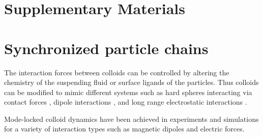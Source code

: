 \documentclass[twocolumn,preprintnumbers,amsmath,amssymb,aps,prx]{revtex4}
\begin{document}
%
%


\section{Supplementary Materials}


\section{Synchronized particle chains}
\label{sec:sync}
The interaction forces between colloids can be controlled 
by altering the chemistry of the suspending fluid
or surface ligands of the particles.
Thus colloids can 
be modified to mimic different
systems such as hard spheres interacting via contact forces \cite{},
dipole interactions \cite{},
and long range electrostatic interactions \cite{}.

Mode-locked 
colloid dynamics have been achieved in 
experiments \cite{Juniper2015, Lutz2004} and
simulations \cite{Herrera-Velarde2007, Herrera-Velarde2008} 
for a variety of interaction types such as 
magnetic dipoles and electric forces.
\end{document}
